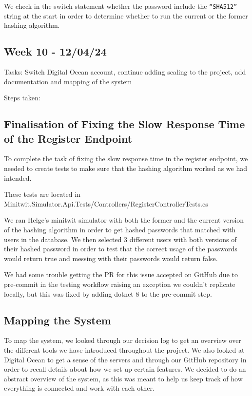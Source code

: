 We check in the switch statement whether the password include the \texttt{“SHA512”} string at the start in order to determine whether to run the current or the former hashing algorithm.

\subsection{Week 10 - 12/04/24}
\label{log:week10}

Tasks: Switch Digital Ocean account, continue adding scaling to the project, add documentation and mapping of the system

Steps taken:

\subsection{Finalisation of Fixing the Slow Response Time of the Register Endpoint}
\label{log:finalization-of-fixing-the-slow-response-time-of-the-register-endpoint}

To complete the task of fixing the slow response time in the register endpoint, we needed to create tests to make sure that the hashing algorithm worked as we had intended.

These tests are located in Minitwit.Simulator.Api.Tests/Controllers/RegisterControllerTests.cs

We ran Helge's minitwit simulator with both the former and the current version of the hashing algorithm in order to get hashed passwords that matched with users in the database. We then selected 3 different users with both versions of their hashed password in order to test that the correct usage of the passwords would return true and messing with their passwords would return false.

We had some trouble getting the PR for this issue accepted on GitHub due to pre-commit in the testing workflow raising an exception we couldn't replicate locally, but this was fixed by adding dotnet 8 to the pre-commit step.

\subsection{Mapping the System}
\label{log:mapping-the-system}

To map the system, we looked through our decision log to get an overview over the different tools we have introduced throughout the project. We also looked at Digital Ocean to get a sense of the servers and through our GitHub repository in order to recall details about how we set up certain features. We decided to do an abstract overview of the system, as this was meant to help us keep track of how everything is connected and work with each other.

